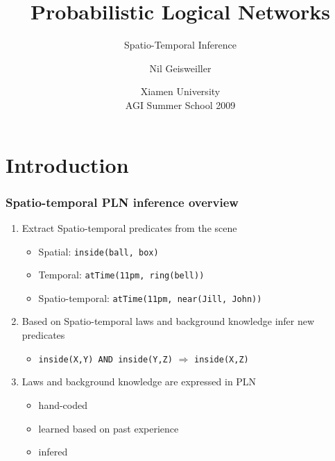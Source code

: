 \documentclass{beamer}
\title{Probabilistic Logical Networks}
\subtitle{Spatio-Temporal  Inference}
\author{Nil Geisweiller}
\institute[Xiamen University] %
{
  Novamente LLC
}
\date[Xiamen University AGI Summer School 2009] %
{Xiamen University\\ AGI Summer School 2009}
\begin{document}
\frame
{
  \maketitle
}
\section[Outline]{}
\frame{\tableofcontents}

\section{Introduction}

\frame
{
  \frametitle{Spatio-temporal PLN inference overview}

  \begin{enumerate}
  \item<+-> \alert{Extract Spatio-temporal predicates} from the scene
    \begin{itemize}
    \item Spatial: {\tt inside(ball, box)}
    \item Temporal: {\tt atTime(11pm, ring(bell))}
    \item Spatio-temporal: {\tt atTime(11pm, near(Jill, John))}
    \end{itemize}
  \item<+-> Based on Spatio-temporal laws and background knowledge \alert{infer
    new predicates}
    \begin{itemize}
    \item {\tt inside(X,Y) AND inside(Y,Z)} $\Rightarrow$ {\tt inside(X,Z)}
    \end{itemize}
  \item<+-> Laws and background knowledge are
    \alert{expressed in PLN}
    \begin{itemize}
    \item hand-coded
    \item learned based on past experience
    \item infered
    \end{itemize}
  \end{enumerate}

}
\end{document}
